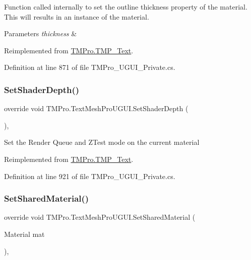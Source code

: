 Function called internally to set the outline thickness property of the material. This will results in an instance of the material. 


\begin{DoxyParams}{Parameters}
{\em thickness} & \\
\hline
\end{DoxyParams}


Reimplemented from \mbox{\hyperlink{class_t_m_pro_1_1_t_m_p___text_a64858ad286418942ec69bc438eec39d4}{T\+M\+Pro.\+T\+M\+P\+\_\+\+Text}}.



Definition at line 871 of file T\+M\+Pro\+\_\+\+U\+G\+U\+I\+\_\+\+Private.\+cs.

\mbox{\label{class_t_m_pro_1_1_text_mesh_pro_u_g_u_i_a764d47b0d54909e0e981e6ab50e95191}} 
\subsubsection{\texorpdfstring{SetShaderDepth()}{SetShaderDepth()}}
{\footnotesize\ttfamily override void T\+M\+Pro.\+Text\+Mesh\+Pro\+U\+G\+U\+I.\+Set\+Shader\+Depth (\begin{DoxyParamCaption}{ }\end{DoxyParamCaption})\hspace{0.3cm}{\ttfamily [protected]}, {\ttfamily [virtual]}}



Set the Render Queue and Z\+Test mode on the current material 



Reimplemented from \mbox{\hyperlink{class_t_m_pro_1_1_t_m_p___text_a311f4fd9aa77c8cd143b686f555aa579}{T\+M\+Pro.\+T\+M\+P\+\_\+\+Text}}.



Definition at line 921 of file T\+M\+Pro\+\_\+\+U\+G\+U\+I\+\_\+\+Private.\+cs.

\mbox{\label{class_t_m_pro_1_1_text_mesh_pro_u_g_u_i_a37642717b05a3ef8cb0eaa004b2f00bc}} 
\subsubsection{\texorpdfstring{SetSharedMaterial()}{SetSharedMaterial()}}
{\footnotesize\ttfamily override void T\+M\+Pro.\+Text\+Mesh\+Pro\+U\+G\+U\+I.\+Set\+Shared\+Material (\begin{DoxyParamCaption}\item[{Material}]{mat }\end{DoxyParamCaption})\hspace{0.3cm}{\ttfamily [protected]}, {\ttfamily [virtual]}}



